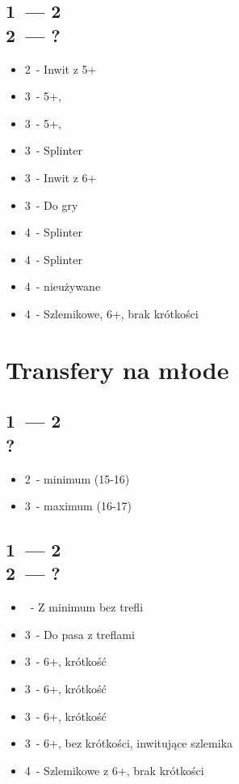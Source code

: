 \documentclass[12pt, a4paper]{article}
\begin{document}
    \subsection{1\ntx\ --- 2\hearts \\ 2\spades\ --- ?}
    \begin{itemize}
        \item 2\nt\ - Inwit z 5+\spades
        \item 3\clubs\ - 5+\clubs, \gf 
        \item 3\diams\ - 5+\diams, \gf \br
        \item 3\hearts\ - Splinter \hearts
        \item 3\spades\ - Inwit z 6+\spades
        \item 3\nt\ - Do gry \br
        \item 4\clubs\ - Splinter \clubs 
        \item 4\diams\ - Splinter \diams
        \item 4\hearts\ - nieużywane
        \item 4\spades\ - Szlemikowe, 6+\spades, brak krótkości
    \end{itemize}


    \pagebreak

    \section{Transfery na młode}
    \subsection{1\ntx\ --- 2\spades \\ ?}
    \begin{itemize}
        \item 2\nt\ - minimum (15-16)
        \item 3\clubs\ - maximum (16-17)
    \end{itemize}

    \subsection{1\ntx\ --- 2\spades \\ 2\nt\ --- ?}
    \begin{itemize}
        \item \pass\ - Z minimum bez trefli
        \item 3\clubs\ - Do pasa z treflami \br
        \item 3\diams\ - 6+\clubs, krótkość \diams 
        \item 3\hearts\ - 6+\clubs, krótkość \hearts 
        \item 3\spades\ - 6+\clubs, krótkość \spades 
        \item 3\nt\ - 6+\clubs, bez krótkości, inwitujące szlemika
        \item 4\clubs\ - Szlemikowe z 6+\clubs, brak krótkości
    \end{itemize}
\end{document}
